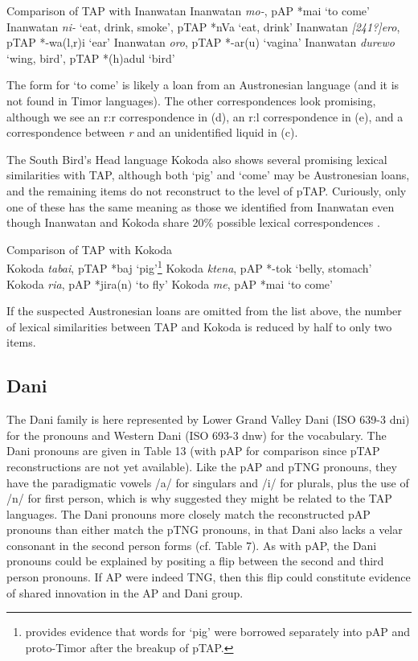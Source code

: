 \ea%
  Comparison of TAP with Inanwatan \citep{DeVries2004}
  \ea Inanwatan \textit{mo-}, pAP *mai `to come'
  \ex Inanwatan \textit{ni- }`eat, drink, smoke', pTAP *nVa `eat, drink'
  \ex Inanwatan \textit{[241?]}\textit{ero}, pTAP *-wa(l,r)i `ear'
  \ex Inanwatan \textit{oro}, pTAP *-ar(u) `vagina'
  \ex Inanwatan \textit{durewo} `wing, bird', pTAP *(h)adul `bird'
  \z
\z


The form for `to come' is likely a loan from an Austronesian language (and it is not found in Timor languages). The other correspondences look promising, although we see an r:r correspondence in (d), an r:l correspondence in (e), and a correspondence between \textit{r} and an unidentified liquid in (c).

The South Bird's Head language Kokoda also shows several promising lexical similarities with TAP, although both `pig' and `come' may be Austronesian loans, and the remaining items do not reconstruct to the level of pTAP. Curiously, only one of these has the same meaning as those we identified from Inanwatan even though Inanwatan and Kokoda share 20\% possible lexical correspondences \citep[133]{DeVries2004}.

\ea%
  Comparison of TAP with Kokoda \citep{DeVries2004} \\
  \ea Kokoda \textit{ta{\textprimstress}bai}, pTAP *baj `pig'\footnote{\citet{Robinsonforthcoming} provides evidence that words for `pig' were borrowed separately into pAP and proto-Timor after the breakup of pTAP.}
  \ex Kokoda \textit{k{\textopeno}{\textprimstress}tena}, pAP *-tok `belly, stomach'
  \ex Kokoda \textit{{\textprimstress}{\textbardotlessj}{\textepsilon}ria}, pAP *jira(n) `to fly'
  \ex Kokoda \textit{m{\textopeno}e}, pAP *mai `to come'
  \z
\z

If the suspected Austronesian loans are omitted from the list above, the number of lexical similarities between TAP and Kokoda is reduced by half to only two items.

\subsection{Dani}
The Dani family is here represented by Lower Grand Valley Dani (ISO 639-3 dni) for the pronouns and Western Dani (ISO 693-3 dnw) for the vocabulary. The Dani pronouns are given in Table 13 (with pAP for comparison since pTAP reconstructions are not yet available). Like the pAP and pTNG pronouns, they have the paradigmatic vowels /a/ for singulars and /i/ for plurals, plus the use of /n/ for first person, which is why \citet{Ross2005} suggested they might be related to the TAP languages. The Dani pronouns more closely match the reconstructed pAP pronouns than either match the pTNG pronouns, in that Dani also lacks a velar consonant in the second person forms (cf. Table 7). As with pAP, the Dani pronouns could be explained by positing a flip between the second and third person pronouns. If AP were indeed TNG, then this flip could constitute evidence of shared innovation in the AP and Dani group.


